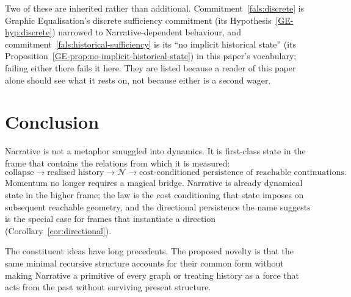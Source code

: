 \documentclass[11pt,a4paper]{article}
\theoremstyle{remark}
\newcommand{\Narr}{\mathcal N}
\begin{document}
\noindent Two of these are inherited rather than additional.
Commitment~\ref{fals:discrete} is Graphic Equalisation's discrete sufficiency commitment
(its Hypothesis~\ref{GE-hyp:discrete}) narrowed to Narrative-dependent behaviour, and
commitment~\ref{fals:historical-sufficiency} is its ``no implicit historical state''
(its Proposition~\ref{GE-prop:no-implicit-historical-state}) in this paper's vocabulary; failing
either there fails it here. They are listed because a reader of this paper alone should see what it
rests on, not because either is a second wager.

\section{Conclusion}\label{sec:conclusion}
Narrative is not a metaphor smuggled into dynamics. It is first-class state in the frame that contains the relations from which it is measured:
\[
\boxed{\text{collapse}\rightarrow\text{realised history}\rightarrow\Narr\rightarrow\text{cost-conditioned persistence of reachable continuations}.}
\]
Momentum no longer requires a magical bridge. Narrative is already dynamical state in the higher frame; the law is the cost conditioning that state imposes on subsequent reachable geometry, and the directional persistence the name suggests is the special case for frames that instantiate a direction (Corollary~\ref{cor:directional}).

The constituent ideas have long precedents. The proposed novelty is that the same minimal recursive structure accounts for their common form without making Narrative a primitive of every graph or treating history as a force that acts from the past without surviving present structure.
\end{document}
